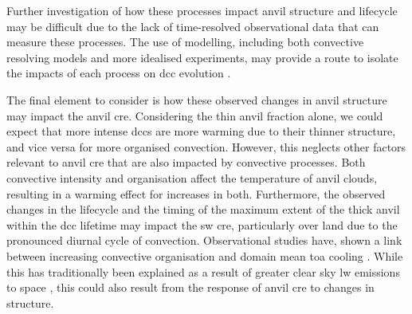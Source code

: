 Further investigation of how these processes impact anvil structure and lifecycle may be difficult due to the lack of time-resolved observational data that can measure these processes.
The use of modelling, including both convective resolving models and more idealised experiments, may provide a route to isolate the impacts of each process on \acrshort{dcc} evolution \citep{gasparini_diurnal_2022}.

The final element to consider is how these observed changes in anvil structure may impact the anvil \acrshort{cre}.
Considering the thin anvil fraction alone, we could expect that more intense \acrshort{dcc}s are more warming due to their thinner structure, and vice versa for more organised convection.
However, this neglects other factors relevant to anvil \acrshort{cre} that are also impacted by convective processes.
Both convective intensity and organisation affect the temperature of anvil clouds, resulting in a warming effect for increases in both.
Furthermore, the observed changes in the lifecycle and the timing of the maximum extent of the thick anvil within the \acrshort{dcc} lifetime may impact the \acrshort{sw} \acrshort{cre}, particularly over land due to the pronounced diurnal cycle of convection.
Observational studies have, shown a link between increasing convective organisation and domain mean \acrshort{toa} cooling \citep{bony_observed_2020}.
While this has traditionally been explained as a result of greater clear sky \acrshort{lw} emissions to space \citep{bony_thermodynamic_2016}, this could also result from the response of anvil \acrshort{cre} to changes in structure.

